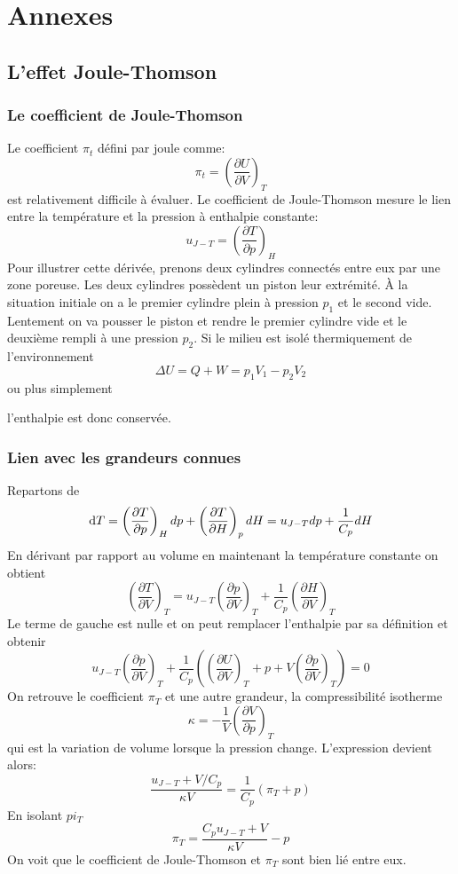 \section{Annexes}
\subsection{L'effet Joule-Thomson}
\subsubsection{Le coefficient de Joule-Thomson}
Le coefficient $\pi_t$ défini par joule comme:
\[ \pi_t = \left(\frac{\partial U}{\partial V}\right)_T \]
est relativement difficile à évaluer.
Le coefficient de Joule-Thomson mesure le lien entre la température et
la pression à enthalpie constante:
\[  u_{J-T} = \left(\frac{\partial T}{\partial p}\right)_H \]
Pour illustrer cette dérivée, prenons deux cylindres connectés
entre eux par une zone poreuse.
Les deux cylindres possèdent un piston leur extrémité.
À la situation initiale on a le premier cylindre plein
à pression $p_1$ et le second vide.
Lentement on va pousser le piston et rendre le premier cylindre vide
et le deuxième rempli à une pression $p_2$.
Si le milieu est isolé thermiquement de l'environnement
\[ \Delta U = Q+ W = p_1V_1-p_2V_2 \]
ou plus simplement

l'enthalpie est donc conservée.
\subsubsection{Lien avec les grandeurs connues}
Repartons de
\[ \operatorname{d}\! T = \left ( \frac{\partial T}{\partial p}\right)_H dp+
\left ( \frac{\partial T}{\partial H}\right)_p dH = u_{J-T}dp+\frac 1{C_p}dH \]
En dérivant par rapport au volume en maintenant
la température constante on obtient
\[ \left ( \frac{\partial T}{\partial V} \right)_T = u_{J-T}\left(\frac{\partial p}{\partial V}\right)_T+\frac 1{C_p}\left(\frac{\partial H}{\partial V}\right)_T \]
Le terme de gauche est nulle et on peut remplacer
l'enthalpie par sa définition et obtenir
\[ u_{J-T}\left(\frac{\partial p}{\partial V}\right)_T+
\frac 1{C_p} \left( \left(\frac{\partial U}{\partial V}\right)_T+p+
V\left(\frac{\partial p}{\partial V}\right)_T\right) = 0 \]
On retrouve le coefficient $\pi_T$ et une autre grandeur,
la compressibilité isotherme
\[  \kappa = - \frac 1V \left(\frac{\partial V}{\partial p}\right)_T \]
qui est la variation de volume lorsque la pression change.
L'expression devient alors:
\[ \frac{u_{J-T}+V/C_p}{\kappa V} = \frac 1{C_p}(\pi_T+p) \]
En isolant $pi_T$
\[  \pi_T = \frac {C_p u_{J-T}+V}{\kappa V}-p \]
On voit que le coefficient de Joule-Thomson et $\pi_T$ sont bien lié entre eux.

